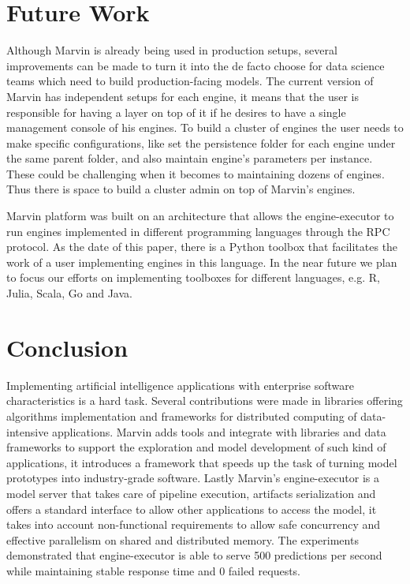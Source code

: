 \documentclass[twoside,11pt]{article}
\begin{document}
\section{Future Work}

Although Marvin is already being used in production setups, several improvements can be made to turn it into the de facto choose for data science teams which need to build production-facing models. The current version of Marvin has independent setups for each engine, it means that the user is responsible for having a layer on top of it if he desires to have a single management console of his engines. To build a cluster of engines the user needs to make specific configurations, like set the persistence folder for each engine under the same parent folder, and also maintain engine's parameters per instance. These could be challenging when it becomes to maintaining dozens of engines. Thus there is space to build a cluster admin on top of Marvin's engines.

Marvin platform was built on an architecture that allows the engine-executor to run engines implemented in different programming languages through the RPC protocol. As the date of this paper, there is a Python toolbox that facilitates the work of a user implementing engines in this language. In the near future we plan to focus our efforts on implementing toolboxes for different languages, e.g. R, Julia, Scala, Go and Java.



\section{Conclusion}
Implementing artificial intelligence applications with enterprise software characteristics is a hard task. Several contributions were made in libraries offering algorithms implementation and frameworks for distributed computing of data-intensive applications. Marvin adds tools and integrate with libraries and data frameworks to support the exploration and model development of such kind of applications, it introduces a framework that speeds up the task of turning model prototypes into industry-grade software. Lastly Marvin's engine-executor is a model server that takes care of pipeline execution, artifacts serialization and offers a standard interface to allow other applications to access the model, it takes into account non-functional requirements to allow safe concurrency and effective parallelism on shared and distributed memory. The experiments demonstrated that engine-executor is able to serve 500 predictions per second while maintaining stable response time and 0 failed requests.
\end{document}
